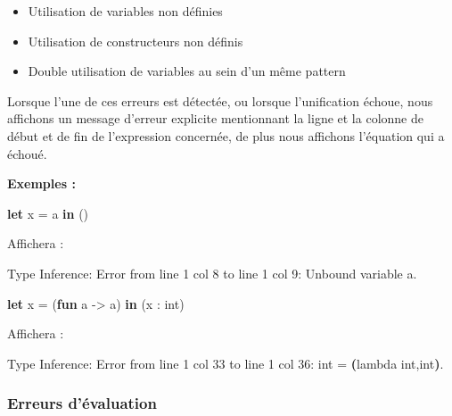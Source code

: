 \documentclass[
  12pt,
]{article}
\newenvironment{Shaded}{}{}
\newcommand{\BuiltInTok}[1]{\textcolor[rgb]{0.00,0.50,0.00}{#1}}
\newcommand{\DataTypeTok}[1]{\textcolor[rgb]{0.56,0.13,0.00}{#1}}
\newcommand{\ErrorTok}[1]{\textcolor[rgb]{1.00,0.00,0.00}{\textbf{#1}}}
\newcommand{\ExtensionTok}[1]{#1}
\newcommand{\KeywordTok}[1]{\textcolor[rgb]{0.00,0.44,0.13}{\textbf{#1}}}
\newcommand{\NormalTok}[1]{#1}
\providecommand{\tightlist}{%
  \setlength{\itemsep}{0pt}\setlength{\parskip}{0pt}}
\begin{document}
\begin{itemize}
\tightlist
\item
  Utilisation de variables non définies
\item
  Utilisation de constructeurs non définis
\item
  Double utilisation de variables au sein d'un même pattern
\end{itemize}

Lorsque l'une de ces erreurs est détectée, ou lorsque l'unification
échoue, nous affichons un message d'erreur explicite mentionnant la
ligne et la colonne de début et de fin de l'expression concernée, de
plus nous affichons l'équation qui a échoué.

\textbf{Exemples :}

\begin{Shaded}
\begin{Highlighting}[]
\KeywordTok{let}\NormalTok{ x = a }\KeywordTok{in}\NormalTok{ ()}
\end{Highlighting}
\end{Shaded}

Affichera :

\begin{Shaded}
\begin{Highlighting}[]
\ExtensionTok{Type}\NormalTok{ Inference:}
\ExtensionTok{Error}\NormalTok{ from line 1 col 8 to line 1 col 9: }
  \ExtensionTok{Unbound}\NormalTok{ variable a.}
\end{Highlighting}
\end{Shaded}

\begin{Shaded}
\begin{Highlighting}[]
\KeywordTok{let}\NormalTok{ x = (}\KeywordTok{fun}\NormalTok{ a {-}\textgreater{} a) }\KeywordTok{in}\NormalTok{ (x : }\DataTypeTok{int}\NormalTok{)}
\end{Highlighting}
\end{Shaded}

Affichera :

\begin{Shaded}
\begin{Highlighting}[]
\ExtensionTok{Type}\NormalTok{ Inference:}
\ExtensionTok{Error}\NormalTok{ from line 1 col 33 to line 1 col 36: }
  \ExtensionTok{int}\NormalTok{ = }\ErrorTok{(}\ExtensionTok{lambda}\NormalTok{ int,int}\KeywordTok{)}\BuiltInTok{.}
\end{Highlighting}
\end{Shaded}

\subsubsection{Erreurs d'évaluation}\label{erreurs-duxe9valuation}
\end{document}
